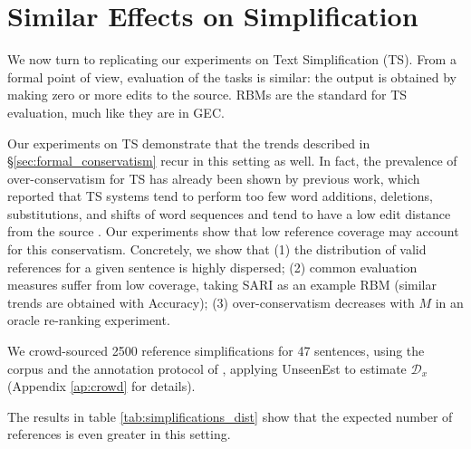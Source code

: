 \documentclass[letterpaper, 11pt]{article}
\newcommand{\oa}[1]{\footnote{\color{red}OA: #1}}
\begin{document}



\section{Similar Effects on Simplification}\label{sec:simplification}

We now turn to replicating our experiments on Text Simplification (TS). From a formal point of view, evaluation of the tasks is similar:
the output is obtained by making zero or more edits to the source. RBMs are the standard for TS evaluation,
much like they are in GEC.

Our experiments on TS demonstrate that the trends described in \S\ref{sec:formal_conservatism} recur in this setting as well. 
In fact, the prevalence of over-conservatism for TS has already been shown by previous work, 
which reported that TS systems tend to perform too few word additions, deletions,
substitutions, and shifts of word sequences \cite{zhang2017sentence} 
and tend to have a low edit distance from the source \cite{narayan2015unsupervised}.
Our experiments show that low reference coverage may account for this conservatism. Concretely, we show that
(1) the distribution of valid references for a given sentence is highly dispersed; 
(2) common evaluation measures suffer from low coverage, taking SARI \cite{Xu-EtAl:2016:TACL} 
as an example RBM (similar trends are obtained with Accuracy); 
(3) over-conservatism decreases with $M$ in an oracle re-ranking experiment.

We crowd-sourced 2500 reference simplifications for 47 sentences, using the corpus and the annotation protocol of 
, applying {\sc UnseenEst} to estimate $\mathcal{D}_x$ (Appendix \ref{ap:crowd} for details).

The results in table \ref{tab:simplifications_dist} show that the expected number of references is even greater in this setting. 
\end{document}
